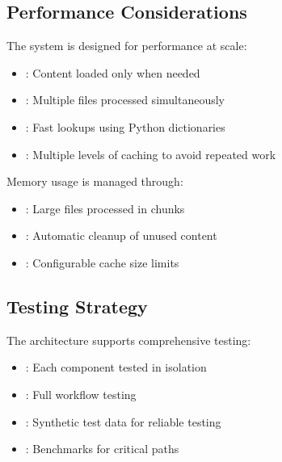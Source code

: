 \documentclass[letterpaper,10pt,english]{sphinxmanual}
\begin{document}
\subsection{Performance Considerations}
\label{\detokenize{developer/architecture:performance-considerations}}
\sphinxAtStartPar
The system is designed for performance at scale:
\begin{itemize}
\item {} 
\sphinxAtStartPar
{}: Content loaded only when needed

\item {} 
\sphinxAtStartPar
{}: Multiple files processed simultaneously

\item {} 
\sphinxAtStartPar
{}: Fast lookups using Python dictionaries

\item {} 
\sphinxAtStartPar
{}: Multiple levels of caching to avoid repeated work

\end{itemize}

\sphinxAtStartPar
Memory usage is managed through:
\begin{itemize}
\item {} 
\sphinxAtStartPar
{}: Large files processed in chunks

\item {} 
\sphinxAtStartPar
{}: Automatic cleanup of unused content

\item {} 
\sphinxAtStartPar
{}: Configurable cache size limits

\end{itemize}


\subsection{Testing Strategy}
\label{\detokenize{developer/architecture:testing-strategy}}
\sphinxAtStartPar
The architecture supports comprehensive testing:
\begin{itemize}
\item {} 
\sphinxAtStartPar
{}: Each component tested in isolation

\item {} 
\sphinxAtStartPar
{}: Full workflow testing

\item {} 
\sphinxAtStartPar
{}: Synthetic test data for reliable testing

\item {} 
\sphinxAtStartPar
{}: Benchmarks for critical paths

\end{itemize}
\end{document}
